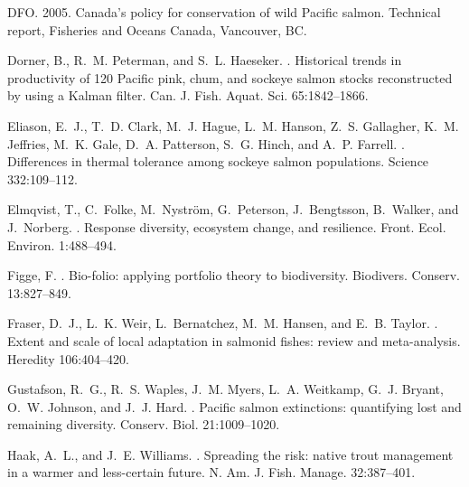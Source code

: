 \documentclass[12pt,english]{article}
\begin{document}
\begin{spacing}{1.3}
\begin{thebibliography}{64}
DFO. 2005.
\newblock Canada's policy for conservation of wild {Pacific} salmon.
\newblock Technical report, Fisheries and Oceans Canada, Vancouver, BC.

Dorner, B., R.~M. Peterman, and S.~L. Haeseker.
.
\newblock Historical trends in productivity of 120 {Pacific} pink, chum, and
  sockeye salmon stocks reconstructed by using a {Kalman} filter.
\newblock Can. J. Fish. Aquat. Sci. 65:1842--1866.

Eliason, E.~J., T.~D. Clark, M.~J. Hague, L.~M. Hanson, Z.~S. Gallagher, K.~M.
  Jeffries, M.~K. Gale, D.~A. Patterson, S.~G. Hinch, and A.~P. Farrell.
.
\newblock Differences in thermal tolerance among sockeye salmon populations.
\newblock Science 332:109--112.

Elmqvist, T., C.~Folke, M.~Nystr{\"o}m, G.~Peterson, J.~Bengtsson, B.~Walker,
  and J.~Norberg.
.
\newblock Response diversity, ecosystem change, and resilience.
\newblock Front. Ecol. Environ. 1:488--494.

Figge, F.
.
\newblock Bio-folio: applying portfolio theory to biodiversity.
\newblock Biodivers. Conserv. 13:827--849.

Fraser, D.~J., L.~K. Weir, L.~Bernatchez, M.~M. Hansen, and E.~B. Taylor.
.
\newblock Extent and scale of local adaptation in salmonid fishes: review and
  meta-analysis.
\newblock Heredity 106:404--420.

Gustafson, R.~G., R.~S. Waples, J.~M. Myers, L.~A. Weitkamp, G.~J. Bryant,
  O.~W. Johnson, and J.~J. Hard.
.
\newblock Pacific salmon extinctions: quantifying lost and remaining diversity.
\newblock Conserv. Biol. 21:1009--1020.

Haak, A.~L., and J.~E. Williams.
.
\newblock Spreading the risk: native trout management in a warmer and
  less-certain future.
\newblock N. Am. J. Fish. Manage. 32:387--401.


\end{thebibliography}
\end{spacing}
\end{document}
